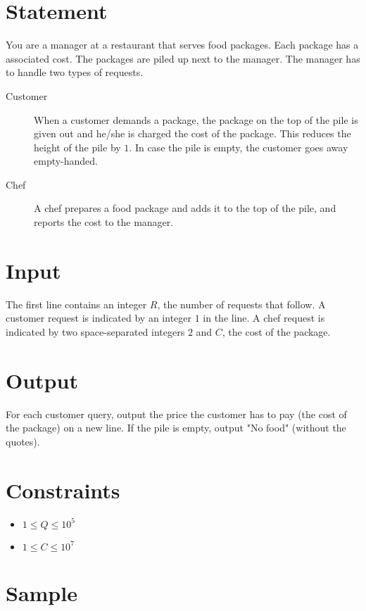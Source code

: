\documentclass{article}
\begin{document}
\section*{Statement}

You are a manager at a restaurant that serves food packages. Each package has a associated cost. The packages are piled up next to the manager. The manager has to handle two types of requests.

\begin{description}
    \item[Customer] When a customer demands a package, the package on the top of the pile is given out and he/she is charged the cost of the package. This reduces the height of the pile by $1$. In case the pile is empty, the customer goes away empty-handed.
    
    \item[Chef] A chef prepares a food package and adds it to the top of the pile, and reports the cost to the manager.
\end{description}

\section*{Input}

The first line contains an integer $R$, the number of requests that follow. A customer request is indicated by an integer $1$ in the line. A chef request is indicated by two space-separated integers $2$ and $C$, the cost of the package.

\section*{Output}

For each customer query, output the price the customer has to pay (the cost of the package) on a new line. If the pile is empty, output "No food" (without the quotes).

\section*{Constraints}

\begin{itemize}
    \item $1 \le Q \le 10^{5}$
    \item $1 \le C \le 10^{7}$
\end{itemize}

\section*{Sample}
\end{document}
